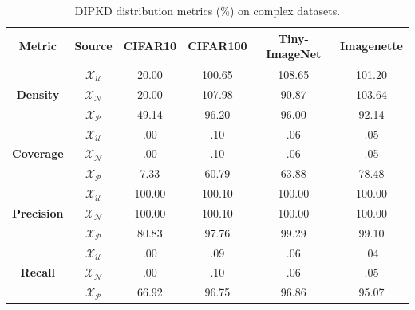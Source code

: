 \documentclass[12pt, a4paper, twoside]{book}
\numberwithin{equation}{chapter}
\theoremstyle{plain}
\theoremstyle{definition}
\theoremstyle{remark}
\begin{document}
\begin{table}[ht]
  \centering
  \begin{threeparttable}
    \caption[DIPKD distribution metrics on complex datasets.]{
      DIPKD distribution metrics (\%) on complex datasets.
    }
    \label{tab:abla-embeddings-coverage-objects}
    \small
    \begin{tabular}{c c c c c c}
      \toprule
      \textbf{Metric} & \textbf{Source} & \textbf{CIFAR10} & \textbf{CIFAR100} & \textbf{Tiny-ImageNet} & \textbf{Imagenette} \\
      \midrule
      & $\mathcal{X}_\mathcal{U}$ & \phantom{0}20.00 &           100.65 &           108.65 &           101.20 \\
      \textbf{Density}   & $\mathcal{X}_\mathcal{N}$ & \phantom{0}20.00 &           107.98 & \phantom{0}90.87 &           103.64 \\
      & $\mathcal{X}_\mathcal{P}$ & \phantom{0}49.14 & \phantom{0}96.20 & \phantom{0}96.00 & \phantom{0}92.14 \\
      \midrule
      & $\mathcal{X}_\mathcal{U}$ & \phantom{000}.00 & \phantom{000}.10 & \phantom{000}.06 & \phantom{000}.05 \\
      \textbf{Coverage}  & $\mathcal{X}_\mathcal{N}$ & \phantom{000}.00 & \phantom{000}.10 & \phantom{000}.06 & \phantom{000}.05 \\
      & $\mathcal{X}_\mathcal{P}$ & \phantom{00}7.33 & \phantom{0}60.79 & \phantom{0}63.88 & \phantom{0}78.48 \\
      \midrule
      & $\mathcal{X}_\mathcal{U}$ &           100.00 &           100.10 &           100.00 &           100.00 \\
      \textbf{Precision} & $\mathcal{X}_\mathcal{N}$ &           100.00 &           100.10 &           100.00 &           100.00 \\
      & $\mathcal{X}_\mathcal{P}$ & \phantom{0}80.83 & \phantom{0}97.76 & \phantom{0}99.29 & \phantom{0}99.10 \\
      \midrule
      & $\mathcal{X}_\mathcal{U}$ & \phantom{000}.00 & \phantom{000}.09 & \phantom{000}.06 & \phantom{000}.04 \\
      \textbf{Recall}    & $\mathcal{X}_\mathcal{N}$ & \phantom{000}.00 & \phantom{000}.10 & \phantom{000}.06 & \phantom{000}.05 \\
      & $\mathcal{X}_\mathcal{P}$ & \phantom{0}66.92 & \phantom{0}96.75 & \phantom{0}96.86 & \phantom{0}95.07 \\
      \bottomrule
    \end{tabular}
  \end{threeparttable}
\end{table}
\end{document}
